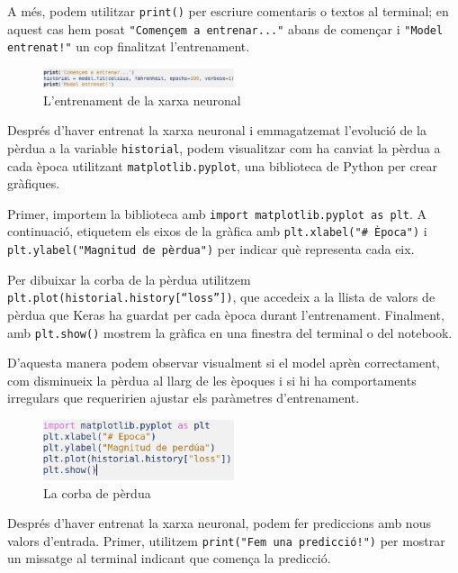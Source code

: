 A més, podem utilitzar \texttt{print()} per escriure comentaris o textos al terminal; en aquest cas hem posat \texttt{"Començem a entrenar..."} abans de començar i \texttt{"Model entrenat!"} un cop finalitzat l'entrenament.

\begin{figure}[H]
    \centering
    \includegraphics[width=0.5\textwidth]{./figures/6.png}
    \caption{L'entrenament de la xarxa neuronal}
\end{figure}
\label{matplotlib}
Després d’haver entrenat la xarxa neuronal i emmagatzemat l’evolució de la pèrdua a la variable \texttt{historial}, podem visualitzar com ha canviat la pèrdua a cada època utilitzant \texttt{matplotlib.pyplot}, una biblioteca de Python per crear gràfiques.

Primer, importem la biblioteca amb \texttt{import matplotlib.pyplot as plt}. A continuació, etiquetem els eixos de la gràfica amb \texttt{plt.xlabel("\# Època")} i \texttt{plt.ylabel("Magnitud de pèrdua")} per indicar què representa cada eix.

Per dibuixar la corba de la pèrdua utilitzem \texttt{plt.plot(historial.history[``loss''])}, que accedeix a la llista de valors de pèrdua que Keras ha guardat per cada època durant l’entrenament. Finalment, amb \texttt{plt.show()} mostrem la gràfica en una finestra del terminal o del notebook.

D’aquesta manera podem observar visualment si el model aprèn correctament, com disminueix la pèrdua al llarg de les èpoques i si hi ha comportaments irregulars que requeririen ajustar els paràmetres d’entrenament.

\begin{figure}[H]
    \centering
    \includegraphics[width=0.5\textwidth]{./figures/7.png}
    \caption{La corba de pèrdua}
\end{figure}

Després d’haver entrenat la xarxa neuronal, podem fer prediccions amb nous valors d’entrada. Primer, utilitzem \texttt{print("Fem una predicció!")} per mostrar un missatge al terminal indicant que comença la predicció.

